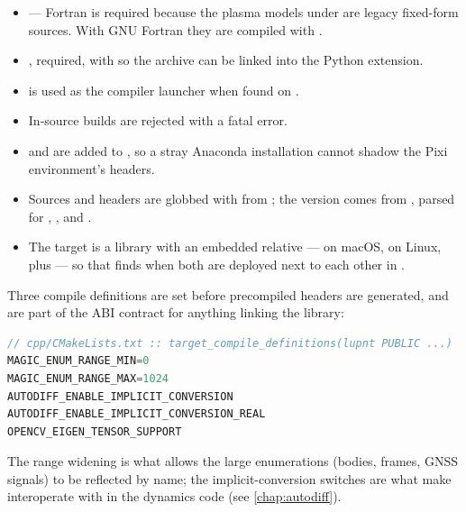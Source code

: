\begin{itemize}[leftmargin=1.4em]
  \item {} --- Fortran is required
    because the plasma models under
     are legacy fixed-form sources.
    With GNU Fortran they are compiled with
    .
  \item {}, required, with
     so the archive can be linked
    into the Python extension.
  \item {} is used as the compiler launcher when found on
    .
  \item In-source builds are rejected with a fatal error.
  \item {} and  are added to
    , so a stray Anaconda installation cannot
    shadow the Pixi environment's headers.
  \item Sources and headers are globbed with  from
    ; the version comes from ,
    parsed for , , and .
  \item The target is a  library with an embedded relative
     ---  on macOS,  on
    Linux, plus  --- so that  finds
     when both are deployed next to each other in
    .
\end{itemize}

Three compile definitions are set  before precompiled headers are
generated, and are part of the ABI contract for anything linking the library:

\begin{lstlisting}[language=cpp]
// cpp/CMakeLists.txt :: target_compile_definitions(lupnt PUBLIC ...)
MAGIC_ENUM_RANGE_MIN=0
MAGIC_ENUM_RANGE_MAX=1024
AUTODIFF_ENABLE_IMPLICIT_CONVERSION
AUTODIFF_ENABLE_IMPLICIT_CONVERSION_REAL
OPENCV_EIGEN_TENSOR_SUPPORT
\end{lstlisting}

The  range widening is what allows the large enumerations
(bodies, frames, GNSS signals) to be reflected by name; the 
implicit-conversion switches are what make  interoperate with
 in the dynamics code (see \cref{chap:autodiff}).

